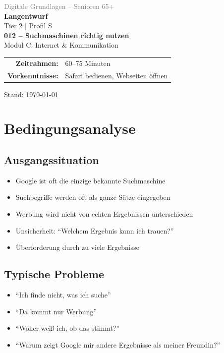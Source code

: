 \documentclass[11pt,a4paper]{article}
\begin{document}
\begin{titlepage}
    \centering
    \vspace*{2cm}
    {\Large\textcolor{gray}{Digitale Grundlagen -- Senioren 65+}}\\[2cm]
    {\Huge\textcolor{fach}{\textbf{Langentwurf}}}\\[0.5cm]
    {\large Tier 2 | Profil S}\\[2cm]
    {\LARGE\textbf{012 -- Suchmaschinen richtig nutzen}}\\[0.5cm]
    {\large Modul C: Internet \& Kommunikation}\\[2cm]
    \begin{tabular}{rl}
        \textbf{Zeitrahmen:} & 60--75 Minuten \\
        \textbf{Vorkenntnisse:} & Safari bedienen, Webseiten öffnen \\
    \end{tabular}
    \vfill
    {\normalsize Stand: \today}
\end{titlepage}

\tableofcontents
\newpage

\section{Bedingungsanalyse}

\subsection{Ausgangssituation}
\begin{itemize}
    \item Google ist oft die einzige bekannte Suchmaschine
    \item Suchbegriffe werden oft als ganze Sätze eingegeben
    \item Werbung wird nicht von echten Ergebnissen unterschieden
    \item Unsicherheit: ``Welchem Ergebnis kann ich trauen?''
    \item Überforderung durch zu viele Ergebnisse
\end{itemize}

\subsection{Typische Probleme}
\begin{itemize}
    \item ``Ich finde nicht, was ich suche''
    \item ``Da kommt nur Werbung''
    \item ``Woher weiß ich, ob das stimmt?''
    \item ``Warum zeigt Google mir andere Ergebnisse als meiner Freundin?''
\end{itemize}
\end{document}
